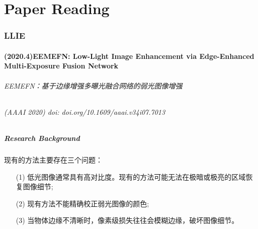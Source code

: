 \documentclass[letterpaper,10pt]{article}
\begin{document}

	
	\part{Paper Reading}
	
	\section{LLIE}
		
		\subsection{(2020.4)EEMEFN: Low-Light Image Enhancement via Edge-Enhanced Multi-Exposure Fusion Network}
		
		\paragraph{EEMEFN：基于边缘增强多曝光融合网络的弱光图像增强}
		
		\paragraph{(AAAI 2020) doi: doi.org/10.1609/aaai.v34i07.7013}
		
			\subsubsection{Research Background}
			
			现有的方法主要存在三个问题：
			
			\begin{itemize}
				\item[(1)] 
				低光图像通常具有高对比度。现有的方法可能无法在极暗或极亮的区域恢复图像细节;
				
				\item[(2)]
				现有方法不能精确校正弱光图像的颜色;
				
				\item[(3)]
				当物体边缘不清晰时，像素级损失往往会模糊边缘，破坏图像细节。
				
			\end{itemize}	
			
\end{document}
